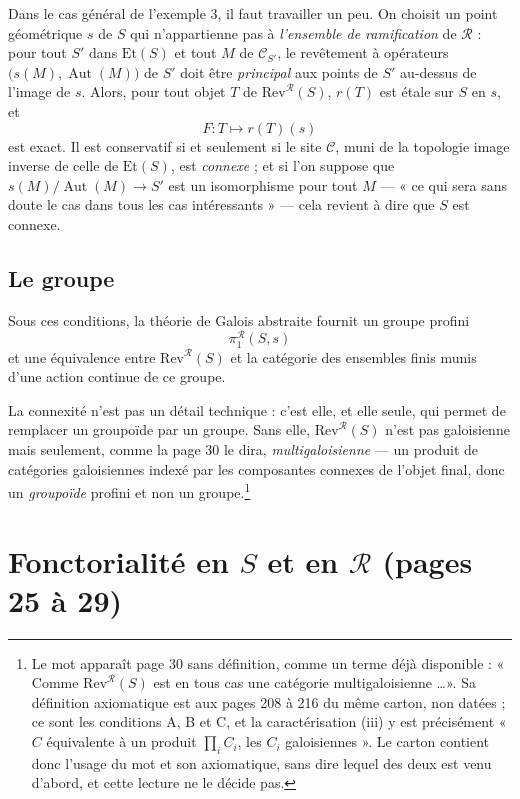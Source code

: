 \documentclass[11pt,a4paper]{article}
\begin{document}
Dans le cas général de l'exemple 3, il faut travailler un peu. On choisit un
point géométrique $s$ de $S$ qui n'appartienne pas à \emph{l'ensemble de
ramification} de $\mathcal{R}$ : pour tout $S'$ dans $\mathrm{Et}(S)$ et tout
$M$ de $\mathcal{C}_{S'}$, le revêtement à opérateurs $\bigl(s(M),
\operatorname{Aut}(M)\bigr)$ de $S'$ doit être \emph{principal} aux points de
$S'$ au-dessus de l'image de $s$. Alors, pour tout objet $T$ de
$\mathrm{Rev}^{\mathcal{R}}(S)$, $r(T)$ est étale sur $S$ en $s$, et
\[
  F : T \longmapsto r(T)(s)
\]
est exact. Il est conservatif si et seulement si le site $\mathcal{C}$, muni de
la topologie image inverse de celle de $\mathrm{Et}(S)$, est \emph{connexe} ;
et si l'on suppose que $s(M)/\!\operatorname{Aut}(M) \to S'$ est un isomorphisme
pour tout $M$ --- « ce qui sera sans doute le cas dans tous les cas
intéressants » --- cela revient à dire que $S$ est connexe.

\subsection*{Le groupe}

Sous ces conditions, la théorie de Galois abstraite fournit un groupe profini
\[
  \pi_{1}^{\mathcal{R}}(S, s)
\]
et une équivalence entre $\mathrm{Rev}^{\mathcal{R}}(S)$ et la catégorie des
ensembles finis munis d'une action continue de ce groupe.

La connexité n'est pas un détail technique : c'est elle, et elle seule, qui
permet de remplacer un groupoïde par un groupe. Sans elle,
$\mathrm{Rev}^{\mathcal{R}}(S)$ n'est pas galoisienne mais seulement, comme la
page 30 le dira, \emph{multigaloisienne} --- un produit de catégories
galoisiennes indexé par les composantes connexes de l'objet final, donc un
\emph{groupoïde} profini et non un groupe.\footnote{Le mot apparaît page 30
sans définition, comme un terme déjà disponible : « Comme
$\mathrm{Rev}^{\mathcal{R}}(S)$ est en tous cas une catégorie
multigaloisienne \dots ». Sa définition axiomatique est aux pages 208 à 216 du
même carton, non datées ; ce sont les conditions A, B et C, et la
caractérisation (iii) y est précisément « $C$ équivalente à un produit
$\prod_{i} C_{i}$, les $C_{i}$ galoisiennes ». Le carton contient donc l'usage
du mot et son axiomatique, sans dire lequel des deux est venu d'abord, et cette
lecture ne le décide pas.}

\section*{Fonctorialité en $S$ et en $\mathcal{R}$ (pages 25 à 29)}
\end{document}
